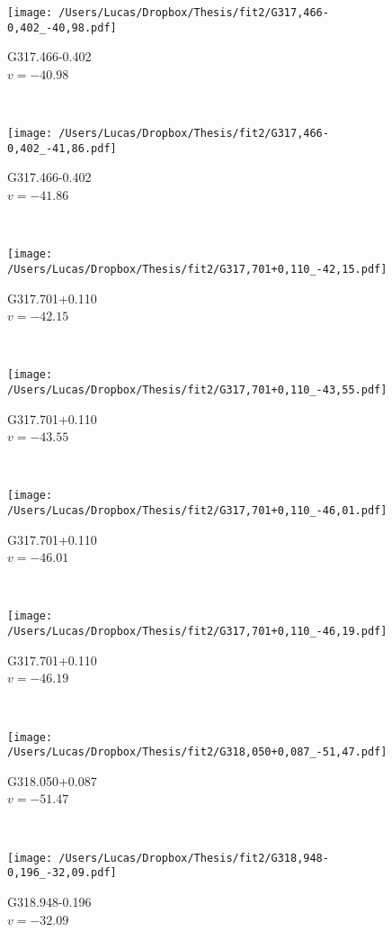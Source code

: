 \begin{figure*}[t]\ContinuedFloat
	\centering
	\begin{subfigure}[t]{0.3\textwidth}
		\texttt{[image: /Users/Lucas/Dropbox/Thesis/fit2/G317,466-0,402\_-40,98.pdf]}
		\caption[]{G317.466-0.402\\$v=-40.98$\,\kms}
	\end{subfigure}
	~
	\begin{subfigure}[t]{0.3\textwidth}
		\texttt{[image: /Users/Lucas/Dropbox/Thesis/fit2/G317,466-0,402\_-41,86.pdf]}
		\caption[]{G317.466-0.402\\$v=-41.86$\,\kms}
	\end{subfigure}
	~
	\begin{subfigure}[t]{0.3\textwidth}
		\texttt{[image: /Users/Lucas/Dropbox/Thesis/fit2/G317,701+0,110\_-42,15.pdf]}
		\caption[]{G317.701+0.110\\$v=-42.15$\,\kms}
	\end{subfigure}
	~
	\begin{subfigure}[t]{0.3\textwidth}
		\texttt{[image: /Users/Lucas/Dropbox/Thesis/fit2/G317,701+0,110\_-43,55.pdf]}
		\caption[]{G317.701+0.110\\$v=-43.55$\,\kms}
	\end{subfigure}
	~
	\begin{subfigure}[t]{0.3\textwidth}
		\texttt{[image: /Users/Lucas/Dropbox/Thesis/fit2/G317,701+0,110\_-46,01.pdf]}
		\caption[]{G317.701+0.110\\$v=-46.01$\,\kms}
	\end{subfigure}
	~
	\begin{subfigure}[t]{0.3\textwidth}
		\texttt{[image: /Users/Lucas/Dropbox/Thesis/fit2/G317,701+0,110\_-46,19.pdf]}
		\caption[]{G317.701+0.110\\$v=-46.19$\,\kms}
	\end{subfigure}
	~
	\begin{subfigure}[t]{0.3\textwidth}
		\texttt{[image: /Users/Lucas/Dropbox/Thesis/fit2/G318,050+0,087\_-51,47.pdf]}
		\caption[]{G318.050+0.087\\$v=-51.47$\,\kms}
	\end{subfigure}
	~
	\begin{subfigure}[t]{0.3\textwidth}
		\texttt{[image: /Users/Lucas/Dropbox/Thesis/fit2/G318,948-0,196\_-32,09.pdf]}
		\caption[]{G318.948-0.196\\$v=-32.09$\,\kms}

\end{subfigure}
\end{figure*}
